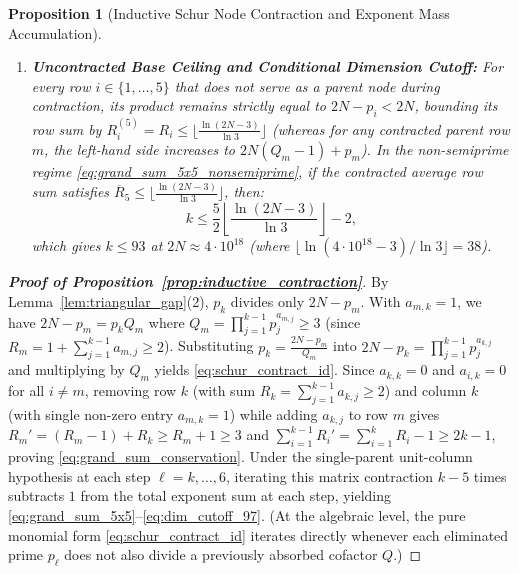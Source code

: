 \documentclass[11pt,a4paper]{article}
\newtheorem{proposition}[theorem]{Proposition}
\theoremstyle{definition}
\begin{document}
\begin{proposition}[Inductive Schur Node Contraction and Exponent Mass Accumulation]
\begin{enumerate}
\begin{equation}
    \sum_{i=1}^5 R_i^{(5)} = \sum_{i=1}^k R_i - (k - 5) \ge k + 5,
    \end{equation}
    and in the non-semiprime regime where at least $k - 1$ rows of $M$ satisfy $R_i \ge 3$ ($\sum_{i=1}^k R_i \ge 3k - 1$),
    \begin{equation}
    \label{eq:grand_sum_5x5_nonsemiprime}
    \sum_{i=1}^5 R_i^{(5)} \ge (3k - 1) - (k - 5) = 2k + 4 > 2k \implies \overline{R}_5 := \frac{1}{5} \sum_{i=1}^5 R_i^{(5)} \ge \frac{2k + 4}{5} > \frac{2k}{5},
    \end{equation}
    forcing at least one row $r \in \{1, \dots, 5\}$ to carry an accumulated exponent sum $R_r^{(5)} \ge \lceil (2k + 4) / 5 \rceil$.
    \item \textbf{Uncontracted Base Ceiling and Conditional Dimension Cutoff:} For every row $i \in \{1, \dots, 5\}$ that does not serve as a parent node during contraction, its product remains strictly equal to $2N - p_i < 2N$, bounding its row sum by $R_i^{(5)} = R_i \le \lfloor \frac{\ln(2N - 3)}{\ln 3} \rfloor$ (whereas for any contracted parent row $m$, the left-hand side increases to $2N(Q_m - 1) + p_m$). In the non-semiprime regime \eqref{eq:grand_sum_5x5_nonsemiprime}, if the contracted average row sum satisfies $\overline{R}_5 \le \lfloor \frac{\ln(2N - 3)}{\ln 3} \rfloor$, then:
    \begin{equation}
    \label{eq:dim_cutoff_97}
    k \le \frac{5}{2} \left\lfloor \frac{\ln(2N - 3)}{\ln 3} \right\rfloor - 2,
    \end{equation}
    which gives $k \le 93$ at $2N \approx 4 \cdot 10^{18}$ (where $\lfloor \ln(4 \cdot 10^{18} - 3) / \ln 3 \rfloor = 38$).
\end{enumerate}
\end{proposition}
\begin{proof}[\textbf{Proof of Proposition~\ref{prop:inductive_contraction}}]
By Lemma~\ref{lem:triangular_gap}(2), $p_k$ divides only $2N - p_m$. With $a_{m,k} = 1$, we have $2N - p_m = p_k Q_m$ where $Q_m = \prod_{j=1}^{k-1} p_j^{a_{m,j}} \ge 3$ (since $R_m = 1 + \sum_{j=1}^{k-1} a_{m,j} \ge 2$). Substituting $p_k = \frac{2N - p_m}{Q_m}$ into $2N - p_k = \prod_{j=1}^{k-1} p_j^{a_{k,j}}$ and multiplying by $Q_m$ yields \eqref{eq:schur_contract_id}. Since $a_{k,k} = 0$ and $a_{i,k} = 0$ for all $i \ne m$, removing row $k$ (with sum $R_k = \sum_{j=1}^{k-1} a_{k,j} \ge 2$) and column $k$ (with single non-zero entry $a_{m,k} = 1$) while adding $a_{k,j}$ to row $m$ gives $R_m' = (R_m - 1) + R_k \ge R_m + 1 \ge 3$ and $\sum_{i=1}^{k-1} R_i' = \sum_{i=1}^k R_i - 1 \ge 2k - 1$, proving \eqref{eq:grand_sum_conservation}. Under the single-parent unit-column hypothesis at each step $\ell = k, \dots, 6$, iterating this matrix contraction $k - 5$ times subtracts $1$ from the total exponent sum at each step, yielding \eqref{eq:grand_sum_5x5}--\eqref{eq:dim_cutoff_97}. (At the algebraic level, the pure monomial form \eqref{eq:schur_contract_id} iterates directly whenever each eliminated prime $p_\ell$ does not also divide a previously absorbed cofactor $Q$.)
\end{proof}
\end{document}
